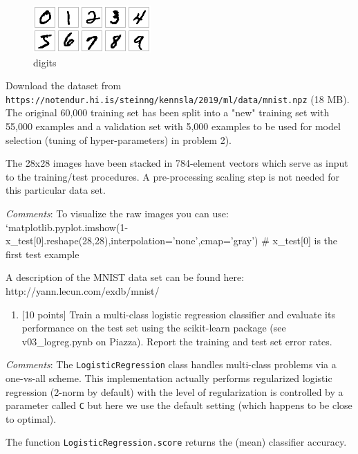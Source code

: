\documentclass[11pt]{article}
\makeatletter
\def\maxwidth{\ifdim\Gin@nat@width>\linewidth\linewidth
    \else\Gin@nat@width\fi}
\let\Oldincludegraphics\includegraphics
\renewcommand{\includegraphics}[1]{\Oldincludegraphics[width=.8\maxwidth]{#1}}
\providecommand{\tightlist}{%
      \setlength{\itemsep}{0pt}\setlength{\parskip}{0pt}}
\makeatother
\begin{document}
\begin{figure}
\centering
\includegraphics{mnist_0-9.png}
\caption{digits}
\end{figure}

Download the dataset from
\texttt{https://notendur.hi.is/steinng/kennsla/2019/ml/data/mnist.npz}
(18 MB). The original 60,000 training set has been split into a "new"
training set with 55,000 examples and a validation set with 5,000
examples to be used for model selection (tuning of hyper-parameters) in
problem 2).

The 28x28 images have been stacked in 784-element vectors which serve as
input to the training/test procedures. A pre-processing scaling step is
not needed for this particular data set.

\emph{Comments}: To visualize the raw images you can use:
`matplotlib.pyplot.imshow(1-x\_test{[}0{]}.reshape(28,28),interpolation='none',cmap='gray')
\# x\_test{[}0{]} is the first test example

A description of the MNIST data set can be found here:
http://yann.lecun.com/exdb/mnist/

    \begin{enumerate}
\def\labelenumi{\alph{enumi})}
\tightlist
\item
  {[}10 points{]} Train a multi-class logistic regression classifier and
  evaluate its performance on the test set using the scikit-learn
  package (see v03\_logreg.pynb on Piazza). Report the training and test
  set error rates.
\end{enumerate}

\emph{Comments}: The \texttt{LogisticRegression} class handles
multi-class problems via a one-vs-all scheme. This implementation
actually performs regularized logistic regression (2-norm by default)
with the level of regularization is controlled by a parameter called
\texttt{C} but here we use the default setting (which happens to be
close to optimal).

The function \texttt{LogisticRegression.score} returns the (mean)
classifier accuracy.
\end{document}
